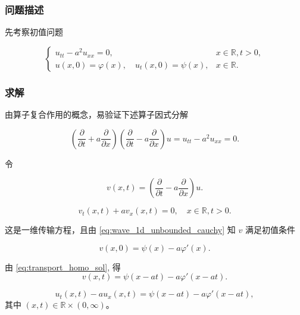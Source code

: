 \documentclass[a4paper, 12pt, oneside]{article} %
\numberwithin{subsection}{section}
\numberwithin{subsubsection}{subsection}
\theoremstyle{plain}
\theoremstyle{definition}
\theoremstyle{remark}
\begin{document}
		\subsubsection{问题描述}
		先考察初值问题
		
		\begin{equation}\label{eq:wave_1d_unbounded_cauchy}
			\begin{cases}
				u_{tt} - a^2 u_{xx} = 0, & x \in \mathbb{R}, t > 0, \\
				u(x, 0) = \varphi(x), \quad u_t(x, 0) = \psi(x), & x \in \mathbb{R}.
			\end{cases}
		\end{equation}
		
		\subsubsection{求解}
		由算子复合作用的概念，易验证下述算子因式分解
		
		\begin{equation}
			\left( \frac{\partial}{\partial t} + a \frac{\partial}{\partial x} \right) \left( \frac{\partial}{\partial t} - a \frac{\partial}{\partial x} \right) u = u_{tt} - a^2 u_{xx} = 0.
		\end{equation}
		
		令
		
		\begin{equation}
			v(x, t) = \left( \frac{\partial}{\partial t} - a \frac{\partial}{\partial x} \right) u.
		\end{equation}
		
		\begin{equation}
			v_t(x, t) + a v_x(x, t) = 0, \quad x \in \mathbb{R}, t > 0.
		\end{equation}
		
		
		这是一维传输方程，且由 \eqref{eq:wave_1d_unbounded_cauchy} 知 \(v\) 满足初值条件
		
		\begin{equation}
			v(x, 0) = \psi(x) - a \varphi'(x).
		\end{equation}
		
		由 \eqref{eq:transport_homo_sol}, 得
		\begin{equation}
			v(x, t) = \psi(x - a t) - a \varphi'(x - a t).
		\end{equation}
		
		\begin{equation}
			u_t(x, t) - a u_x(x, t) = \psi(x - a t) - a \varphi'(x - a t),
		\end{equation}
		其中 \((x, t) \in \mathbb{R} \times (0, \infty)\)。
		
\end{document}
